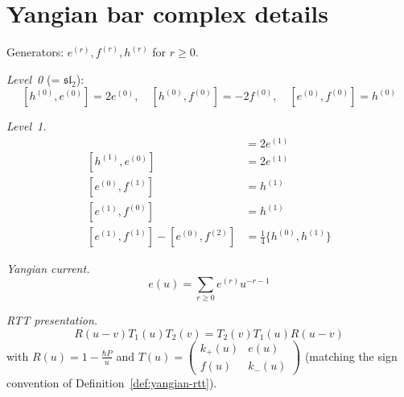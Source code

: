 \section{Yangian bar complex details}
\label{sec:yangian-details}

\begin{computation}\label{comp:yangian-sl2}
Generators: $e^{(r)}, f^{(r)}, h^{(r)}$ for $r \geq 0$.

\emph{Level~0} (= $\mathfrak{sl}_2$):
\[
[h^{(0)}, e^{(0)}] = 2e^{(0)}, \quad [h^{(0)}, f^{(0)}] = -2f^{(0)}, \quad [e^{(0)}, f^{(0)}] = h^{(0)}
\]

\emph{Level~1.}
\begin{align*}
[h^{(0)}, e^{(1)}] &= 2e^{(1)} \\
[h^{(1)}, e^{(0)}] &= 2e^{(1)} \\
[e^{(0)}, f^{(1)}] &= h^{(1)} \\
[e^{(1)}, f^{(0)}] &= h^{(1)} \\
[e^{(1)}, f^{(1)}] - [e^{(0)}, f^{(2)}] &= \frac{1}{4}\{h^{(0)}, h^{(1)}\}
\end{align*}

\emph{Yangian current.}
\[
e(u) = \sum_{r \geq 0} e^{(r)} u^{-r-1}
\]

\emph{RTT presentation.}
\[
R(u-v) T_1(u) T_2(v) = T_2(v) T_1(u) R(u-v)
\]
with $R(u) = 1 - \frac{\hbar P}{u}$ and $T(u) = \begin{pmatrix} k_+(u) & e(u) \\ f(u) & k_-(u) \end{pmatrix}$ (matching the sign convention of Definition~\ref{def:yangian-rtt}).
\end{computation}

